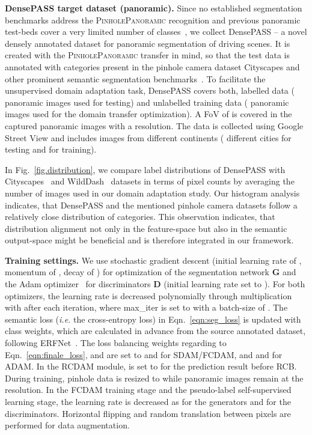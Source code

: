 \documentclass[journal]{IEEEtran}
\begin{document}
\textbf{DensePASS target dataset (panoramic).} 
Since no established segmentation benchmarks address the \textsc{PinholePanoramic} recognition and previous panoramic test-beds cover a very limited number of classes~\cite{pass}\cite{omnirange}, we collect DensePASS -- a novel densely annotated dataset for panoramic segmentation of driving scenes.
It is created with the \textsc{PinholePanoramic} transfer in mind, so that the test data is annotated with  categories present in the pinhole camera dataset Cityscapes and other prominent semantic segmentation benchmarks~\cite{wilddash,bdd}.
To facilitate the unsupervised domain adaptation task, DensePASS covers both, labelled data ( panoramic images used for testing) and unlabelled training data ( panoramic images used for the domain transfer optimization).
A FoV of  is covered in the captured panoramic images with a  resolution.
The data is collected using Google Street View and includes images from different continents ( different cities for testing and  for training).

In Fig.~\ref{fig.distribution}, we compare label distributions of DensePASS with Cityscapes~\cite{cityscapes} and WildDash~\cite{wilddash} datasets in terms of pixel counts by averaging the number of images used in our domain adaptation study.
Our histogram analysis indicates, that DensePASS and the mentioned pinhole camera datasets follow a relatively close distribution of categories.
This observation indicates, that distribution alignment not only in the feature-space but also in the semantic output-space might be beneficial and is therefore integrated in our framework.

\textbf{Training settings.}
We use stochastic gradient descent (initial learning rate of , momentum of , decay of ) for optimization of the segmentation network \textbf{G} and the Adam optimizer~\cite{adam} for  discriminators \textbf{D} (initial learning rate set to ).
For both optimizers, the learning rate is decreased  polynomially through multiplication with   after each iteration, where max\_iter is set to  with a batch-size of . The semantic loss (\emph{i.e.} the cross-entropy loss) in Eqn.~\eqref{eqn:seg_loss} is updated with class weights, which are calculated in advance from the source annotated dataset, following ERFNet~\cite{erfnet}.
The loss balancing weights regarding to Eqn.~\eqref{eqn:finale_loss},  and  are set to  and  for SDAM/FCDAM, and  and  for ADAM.
In the RCDAM module,  is set to  for the prediction result before RCB. 
During training, pinhole data is resized to  while panoramic images remain at the  resolution.
In the FCDAM training stage and the pseudo-label self-supervised learning stage, the learning rate is decreased as  for the generators and  for the discriminators.
Horizontal flipping and random translation between  pixels are performed for data augmentation.
\end{document}
